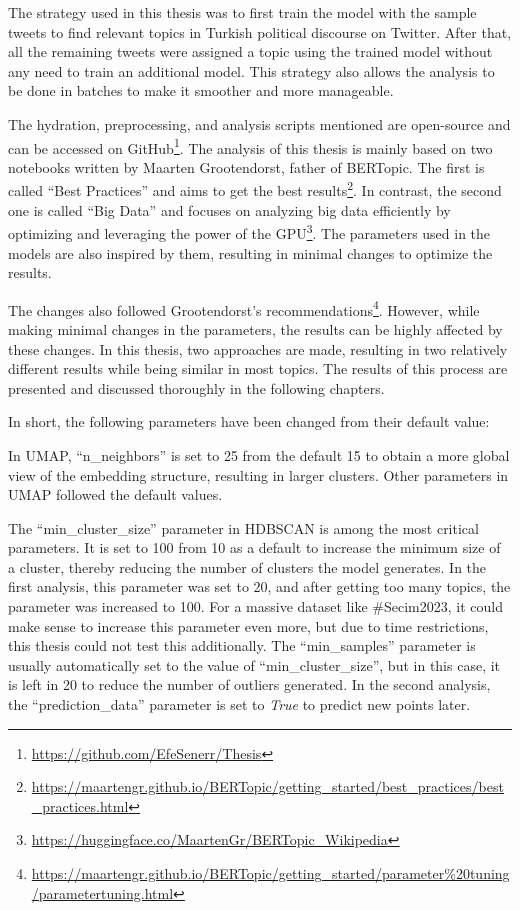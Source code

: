 The strategy used in this thesis was to first train the model with the sample tweets to 
find relevant topics in Turkish political discourse on Twitter. After that, all the 
remaining tweets were assigned a topic using the trained model without any need to train 
an additional model. This strategy also allows the analysis to be done in batches to make 
it smoother and more manageable.

The hydration, preprocessing, and analysis scripts mentioned are open-source and can be 
accessed on GitHub\footnote{\url{https://github.com/EfeSenerr/Thesis}}. The analysis of 
this thesis is mainly based on two notebooks written by Maarten Grootendorst, father of 
BERTopic. The first is called ``Best Practices''
and aims to get the best results\footnote{\url{https://maartengr.github.io/BERTopic/getting_started/best_practices/best_practices.html}}. 
In contrast, the second one is called ``Big Data'' 
and focuses on analyzing big data efficiently by optimizing and leveraging the power of the 
GPU\footnote{\url{https://huggingface.co/MaartenGr/BERTopic_Wikipedia}}. 
The parameters used in the models are also inspired by them, resulting in minimal changes 
to optimize the results. 

The changes also followed Grootendorst's 
recommendations\footnote{\url{https://maartengr.github.io/BERTopic/getting_started/parameter\%20tuning/parametertuning.html}}.
However, while making minimal changes in the parameters, the results can be highly affected 
by these changes. In this thesis, two approaches are made, resulting in two relatively 
different results while being similar in most topics. The results of this process are 
presented and discussed thoroughly in the following chapters.

In short, the following parameters have been changed from their default value: 

In UMAP, ``n\_neighbors'' is set to 25 from the default 15 to obtain a more global view of 
the embedding structure, resulting in larger clusters. Other parameters in UMAP followed 
the default values.

The ``min\_cluster\_size'' parameter in HDBSCAN is among the most critical parameters. It is 
set to 100 from 10 as a default to increase the minimum size of a cluster, thereby reducing 
the number of clusters the model generates. In the first analysis, this parameter was set to 
20, and after getting too many topics, the parameter was increased to 100. For a massive 
dataset like \#Secim2023, it could make sense to increase this parameter even more, but due 
to time restrictions, this thesis could not test this additionally. The ``min\_samples'' 
parameter is usually automatically set to the value of ``min\_cluster\_size'', but in this 
case, it is left in 20 to reduce the number of outliers generated. In the second analysis, 
the ``prediction\_data'' parameter is set to \textit{True} to predict new points later.

